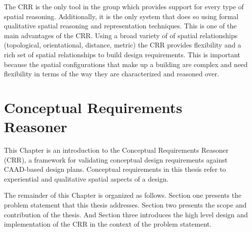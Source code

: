 \documentclass[12pt]{ucthesis}
\begin{document}
The CRR is the only tool in the group which provides support for every type of spatial reasoning. Additionally, it is the only system that does so using formal qualitative spatial reasoning and representation techniques. This is one of the main advantages of the CRR. Using a broad variety of of spatial relationships (topological, orientational, distance, metric) the CRR provides flexibility and a rich set of spatial relationships to build design requirements. This is important because the spatial configurations that make up a building are complex and need flexibility in terms of the way they are characterized and reasoned over. 


\chapter{Conceptual Requirements Reasoner}
This Chapter is an introduction to the Conceptual Requirements Reasoner (CRR), a framework for validating conceptual design requirements against CAAD-based design plans. Conceptual requirements in this thesis refer to experiential and qualitative spatial aspects of a design.

The remainder of this Chapter is organized as follows. Section one presents the problem statement that this thesis addresses. Section two presents the scope and contribution of the thesis. And Section three introduces the high level design and implementation of the CRR in the context of the problem statement.


\end{document}

